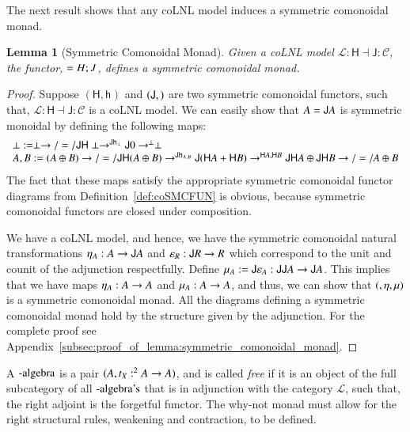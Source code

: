 \documentclass{lmcs}
\newtheorem{lemma}[theorem]{Lemma}
\let\mto\to
\let\to\relax
\newcommand{\to}{\rightarrow}
\let\r\relax
\let\j\relax
\let\wn\relax
\let\H\relax
\newcommand{\cat}[1]{\mathcal{#1}}
\newcommand{\func}[1]{\mathsf{#1}}
\newcommand{\H}[0]{\func{H}}
\newcommand{\J}[0]{\func{J}}
\newcommand{\h}[1]{\mathsf{h}_{#1}}
\newcommand{\r}[1]{\mathsf{r}_{#1}}
\newcommand{\j}[1]{\mathsf{j}_{#1}}
\newcommand{\wn}[0]{\mathop{?}}
\begin{document}
The next result shows that any coLNL model induces a symmetric
comonoidal monad.
\begin{lemma}[Symmetric Comonoidal Monad]
  \label{lemma:symmetric_comonoidal_monad}
  Given a coLNL model $\cat{L} : \func{H} \dashv \func{J} : \cat{C}$,
  the functor, $\wn = H;J$, defines a symmetric comonoidal monad.
\end{lemma}
\begin{proof}
  Suppose $(\func{H},\h{})$ and $(\func{J},\j{})$ are two symmetric
  comonoidal functors, such that, $\cat{L} : \func{H} \dashv \func{J}
  : \cat{C}$ is a coLNL model.  We can easily show that $\wn A = \J\H
  A$ is symmetric monoidal by defining the following maps:
  \[
  \begin{array}{lll}
    \r{\perp} := \wn \perp \mto/=/ \func{JH}\perp \mto^{\func{J}\h{\perp}} \func{J}0 \mto^{\j{\perp}} \perp\\
    \r{A,B} := \wn (A \oplus B) \mto/=/ \func{JH}(A \oplus B) \mto^{\func{J}\h{A,B}} \func{J}(\func{H}A + \func{H}B) \mto^{\j{\func{H}A,\func{H}B}} \func{JH}A \oplus \func{JH}B \mto/=/ \wn A \oplus \wn B\\
  \end{array}
  \]
  The fact that these maps satisfy the appropriate symmetric
  comonoidal functor diagrams from Definition~\ref{def:coSMCFUN} is
  obvious, because symmetric comonoidal functors are closed under
  composition.  

  We have a coLNL model, and hence, we have the symmetric comonoidal
  natural transformations $\eta_A : A \mto \J\H A$ and $\varepsilon_R
  : \H\J R \mto R$ which correspond to the unit and counit of the
  adjunction respectfully.  Define $\mu_A := \J\varepsilon_{\H A} :
  \J\H\J\H A \mto \J\H A$.  This implies that we have maps $\eta_A : A
  \mto \wn A$ and $\mu_A : \wn\wn A \mto \wn A$, and thus, we can show
  that $(\wn, \eta, \mu)$ is a symmetric comonoidal monad.  All
  the diagrams defining a symmetric comonoidal monad hold by the
  structure given by the adjunction.  For the complete proof see
  Appendix~\ref{subsec:proof_of_lemma:symmetric_comonoidal_monad}.
\end{proof}

A $\wn\text{-algebra}$ is a pair $(\wn A, t_X : \wn^2 A \mto \wn A)$,
and is called \textit{free} if it is an object of the full subcategory
of all $\wn\text{-algebra's}$ that is in adjunction with the category
$\cat{L}$, such that, the right adjoint is the forgetful functor.  The
why-not monad must allow for the right structural rules, weakening and
contraction, to be defined.
\end{document}
